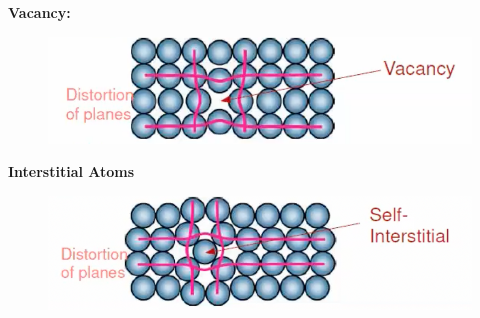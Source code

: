 \documentclass{article}
\begin{document}
    \textbf{Vacancy:}
    \begin{figure}[H]
        \centering
        \includegraphics[width=\textwidth]{images/vacancy.png}
    \end{figure}
    \textbf{Interstitial Atoms}
    \begin{figure}[H]
        \centering
        \includegraphics[width=\textwidth]{images/Interstitial.png}
    \end{figure}
\end{document}
